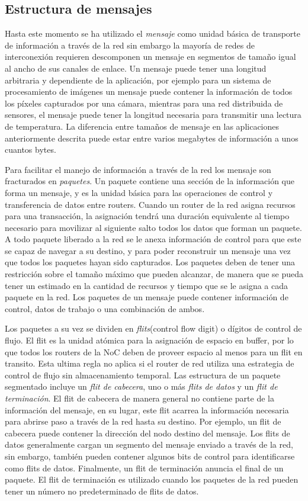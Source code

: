 \subsection{Estructura de mensajes}

Hasta este momento se ha utilizado el \textit{mensaje} como unidad básica de transporte de información a través de la red sin embargo la mayoría de redes de interconexión requieren descomponen un mensaje en segmentos de tamaño igual al ancho de sus canales de enlace. Un mensaje puede tener una longitud arbitraria y dependiente de la aplicación, por ejemplo para un sistema de procesamiento de imágenes un mensaje puede contener la información de todos los píxeles capturados por una cámara, mientras para una red distribuida de sensores, el mensaje puede tener la longitud necesaria para transmitir una lectura de temperatura. La diferencia entre tamaños de mensaje en las aplicaciones anteriormente descrita puede estar entre varios megabytes de información a unos cuantos bytes.

Para facilitar el manejo de información a través de la red los mensaje son fracturados en \textit{paquetes}. Un paquete contiene una sección de la información que forma un mensaje, y es la unidad básica para las operaciones de control y transferencia de datos entre routers. Cuando un router de la red asigna recursos para una transacción, la asignación tendrá una duración equivalente al tiempo necesario para movilizar al siguiente salto  todos los datos que forman un paquete. A todo paquete liberado a la red se le anexa información de control para que este se capaz de navegar a su destino, y para poder reconstruir un mensaje una vez que todos los paquetes hayan sido capturados. Los paquetes deben de tener una restricción sobre el tamaño máximo que pueden alcanzar, de manera que se pueda tener un estimado en la cantidad de recursos y tiempo que se le asigna a cada paquete en la red. Los paquetes de un mensaje puede contener información de control, datos de trabajo o una combinación de ambos.

Los paquetes a su vez se dividen en \textit{flits}(control flow digit) o dígitos de control de flujo. El flit es la unidad atómica para la asignación de espacio en buffer, por lo que todos los routers de la NoC deben de proveer espacio al menos para un flit en transito. Esta ultima regla no aplica si el router de red utiliza una estrategia de control de flujo sin almacenamiento temporal. Las estructura de un paquete segmentado incluye un \textit{flit de cabecera}, uno o más \textit{flits de datos} y un \textit{flit de terminación}. El flit de cabecera de manera general no contiene parte de la información del mensaje, en su lugar, este flit acarrea la información necesaria para abrirse paso a través de la red hasta su destino. Por ejemplo, un flit de cabecera puede contener la dirección del nodo destino del mensaje. Los flits de datos generalmente cargan un segmento del mensaje enviado a través de la red, sin embargo, también pueden contener algunos bits de control para identificarse como flits de datos. Finalmente, un flit de terminación anuncia el final de un paquete. El flit de terminación es utilizado cuando los paquetes de la red pueden tener un número no predeterminado de flits de datos.

